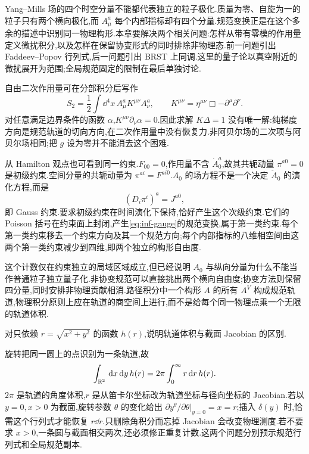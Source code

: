 \label{chap:brst}

Yang--Mills 场的四个时空分量不能都代表独立的粒子极化.质量为零、自旋为一的粒子只有两个横向极化,而 $A_\mu^a$ 每个内部指标却有四个分量.规范变换正是在这个多余的描述中识别同一物理构形.本章要解决两个相关问题:怎样从带有零模的作用量定义微扰积分,以及怎样在保留协变形式的同时排除非物理态.前一问题引出 Faddeev--Popov 行列式,后一问题引出 BRST 上同调.这里的量子论以真空附近的微扰展开为范围;全局规范固定的限制在最后单独讨论.

自由二次作用量可在分部积分后写作
\[
 S_2=\frac12\int\dd^4x\,A_\mu^a
 K^{\mu\nu}A_\nu^a,\qquad
 K^{\mu\nu}=\eta^{\mu\nu}\Box-\partial^\mu\partial^\nu.
\]
对任意满足边界条件的函数 $\alpha$,$K^{\mu\nu}\partial_\nu\alpha=0$.因此求解 $K\Delta=1$ 没有唯一解:纯梯度方向是规范轨道的切向方向,在二次作用量中没有恢复力.非阿贝尔场的二次项与阿贝尔场相同;把 $g$ 设为零并不能消去这个困难.

从 Hamilton 观点也可看到同一约束.$F_{00}=0$,作用量不含 $\dot A_0^a$,故其共轭动量 $\pi^{a0}=0$ 是初级约束.空间分量的共轭动量为 $\pi^{ai}=F^{ai0}$.$A_0$ 的场方程不是一个决定 $\ddot A_0$ 的演化方程,而是
\[
 (D_i\pi^i)^a=J^{a0},
\]
即 Gauss 约束.要求初级约束在时间演化下保持,恰好产生这个次级约束.它们的 Poisson 括号在约束面上封闭,产生\eqref{eq:inf-gauge}的规范变换,属于第一类约束.每个第一类约束移去一个约束方向及其一个规范方向;每个内部指标的八维相空间由这两个第一类约束减少到四维,即两个独立的构形自由度.

这个计数仅在约束独立的局域区域成立,但已经说明 $A_0$ 与纵向分量为什么不能当作普通粒子独立量子化.非协变规范可以直接挑出两个横向自由度;协变方法则保留四分量,同时安排非物理贡献相消.路径积分中一个构形 $A$ 的所有 $A^V$ 构成规范轨道,物理积分原则上应在轨道的商空间上进行,而不是给每个同一物理点乘一个无限的轨道体积.

\begin{example}
对只依赖 $r=\sqrt{x^2+y^2}$ 的函数 $h(r)$,说明轨道体积与截面 Jacobian 的区别.
\end{example}
\begin{solution}
旋转把同一圆上的点识别为一条轨道,故
\[
 \int_{\mathbb R^2}\,\mathrm d x\,\mathrm d y\,h(r)=2\pi\int_0^\infty r\,\mathrm d r\,h(r).
\]
$2\pi$ 是轨道的角度体积,$r$ 是从笛卡尔坐标改为轨道坐标与径向坐标的 Jacobian.若以 $y=0,x>0$ 为截面,旋转参数 $\theta$ 的变化给出 $\partial y^\theta/\partial\theta|_{y=0}=x=r$;插入 $\delta(y)$ 时,恰需这个行列式才能恢复 $r\dd r$.只删除角积分而忘掉 Jacobian 会改变物理测度.若不要求 $x>0$,一条圆与截面相交两次,还必须修正重复计数.这两个问题分别预示规范行列式和全局规范副本.
\end{solution}

